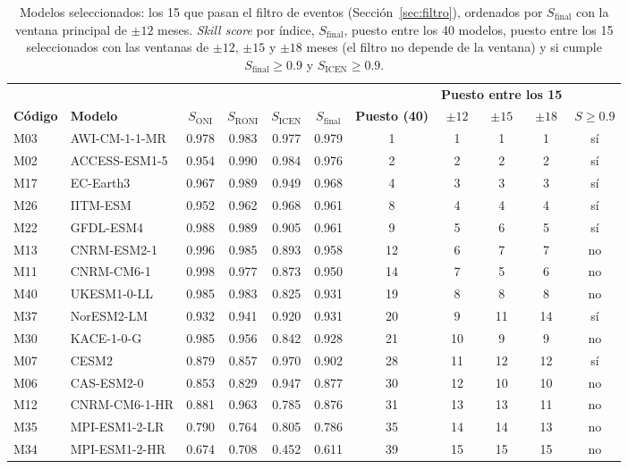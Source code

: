 \documentclass[11pt,a4paper]{article}
\begin{document}
\begin{table}[htbp]
\caption[Modelos seleccionados y su \emph{skill score}.]{Modelos seleccionados: los 15 que pasan el filtro de eventos (Sección~\ref{sec:filtro}), ordenados por $S_{\mathrm{final}}$ con la ventana principal de $\pm12$ meses. \emph{Skill score} por índice, $S_{\mathrm{final}}$, puesto entre los 40 modelos, puesto entre los 15 seleccionados con las ventanas de $\pm12$, $\pm15$ y $\pm18$ meses (el filtro no depende de la ventana) y si cumple $S_{\mathrm{final}} \geq 0.9$ y $S_{\mathrm{ICEN}} \geq 0.9$.}
\label{tab:seleccion}
\centering
\small
\begin{tabular}{@{}llccccccccc@{}}
\toprule
 & & & & & & & \multicolumn{3}{c}{\textbf{Puesto entre los 15}} & \\
\cmidrule(lr){8-10}
\textbf{Código} & \textbf{Modelo} & $S_{\mathrm{ONI}}$ & $S_{\mathrm{RONI}}$ & $S_{\mathrm{ICEN}}$ & $S_{\mathrm{final}}$ & \textbf{Puesto (40)} & $\pm12$ & $\pm15$ & $\pm18$ & $S \geq 0.9$ \\
\midrule
M03 & AWI-CM-1-1-MR & 0.978 & 0.983 & 0.977 & 0.979 & 1 & 1 & 1 & 1 & sí \\
M02 & ACCESS-ESM1-5 & 0.954 & 0.990 & 0.984 & 0.976 & 2 & 2 & 2 & 2 & sí \\
M17 & EC-Earth3 & 0.967 & 0.989 & 0.949 & 0.968 & 4 & 3 & 3 & 3 & sí \\
M26 & IITM-ESM & 0.952 & 0.962 & 0.968 & 0.961 & 8 & 4 & 4 & 4 & sí \\
M22 & GFDL-ESM4 & 0.988 & 0.989 & 0.905 & 0.961 & 9 & 5 & 6 & 5 & sí \\
M13 & CNRM-ESM2-1 & 0.996 & 0.985 & 0.893 & 0.958 & 12 & 6 & 7 & 7 & no \\
M11 & CNRM-CM6-1 & 0.998 & 0.977 & 0.873 & 0.950 & 14 & 7 & 5 & 6 & no \\
M40 & UKESM1-0-LL & 0.985 & 0.983 & 0.825 & 0.931 & 19 & 8 & 8 & 8 & no \\
M37 & NorESM2-LM & 0.932 & 0.941 & 0.920 & 0.931 & 20 & 9 & 11 & 14 & sí \\
M30 & KACE-1-0-G & 0.985 & 0.956 & 0.842 & 0.928 & 21 & 10 & 9 & 9 & no \\
M07 & CESM2 & 0.879 & 0.857 & 0.970 & 0.902 & 28 & 11 & 12 & 12 & sí \\
M06 & CAS-ESM2-0 & 0.853 & 0.829 & 0.947 & 0.877 & 30 & 12 & 10 & 10 & no \\
M12 & CNRM-CM6-1-HR & 0.881 & 0.963 & 0.785 & 0.876 & 31 & 13 & 13 & 11 & no \\
M35 & MPI-ESM1-2-LR & 0.790 & 0.764 & 0.805 & 0.786 & 35 & 14 & 14 & 13 & no \\
M34 & MPI-ESM1-2-HR & 0.674 & 0.708 & 0.452 & 0.611 & 39 & 15 & 15 & 15 & no \\
\bottomrule
\end{tabular}
\end{table}
\end{document}
